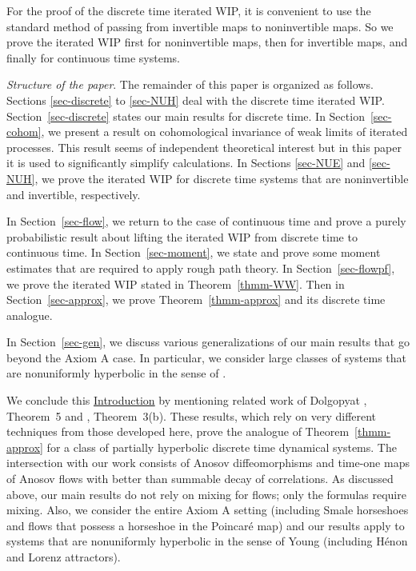 \documentclass[aop,MSNbibl,seceqn,dvips]{arximspdf}
\begin{document}
For the proof of the discrete time iterated WIP, it is convenient to
use the standard method of passing from invertible maps to
noninvertible maps. So we prove the iterated WIP first for
noninvertible maps, then for invertible maps, and finally for
continuous time systems.

\textit{Structure of the paper}.
The remainder of this paper is organized as follows.
Sections \ref{sec-discrete} to \ref{sec-NUH}
deal with the discrete time iterated WIP.
Section~\ref{sec-discrete} states our main results for discrete time.
In Section~\ref{sec-cohom}, we present a result on cohomological
invariance of weak limits of iterated processes. This result seems of
independent theoretical interest but in this paper it is used to
significantly simplify calculations.
In Sections \ref{sec-NUE} and \ref{sec-NUH}, we prove the iterated WIP
for discrete time systems that are noninvertible and invertible, respectively.

In Section~\ref{sec-flow}, we return to the case of continuous time and
prove a purely probabilistic result about lifting the iterated WIP from
discrete time to continuous time.
In Section~\ref{sec-moment}, we state and prove some moment estimates
that are required to apply rough path theory.
In Section~\ref{sec-flowpf}, we
prove the iterated WIP stated in Theorem~\ref{thmm-WW}.
Then in Section~\ref{sec-approx}, we prove Theorem~\ref{thmm-approx} and
its discrete time analogue.

In Section~\ref{sec-gen}, we discuss various generalizations of
our main results that go beyond the Axiom A case. In particular, we
consider large classes of systems that are nonuniformly hyperbolic in
the sense of \cite{Young98,Young99}.

We conclude this \hyperref[sec-intro]{Introduction} by mentioning
related work of
Dolgopyat \cite{Dolgopyat04}, Theorem~5 and \cite{Dolgopyat05},
Theorem~3(b).
These results, which rely on very different techniques from those
developed here, prove the analogue of Theorem~\ref{thmm-approx} for a class
of partially hyperbolic discrete time dynamical systems. The
intersection with our work consists of Anosov diffeomorphisms and
time-one maps of Anosov flows with better than summable decay of
correlations. As discussed above, our main results do not rely on
mixing for flows; only the formulas require mixing. Also, we consider
the entire Axiom A setting (including Smale horseshoes and flows
that possess a horseshoe in the Poincar\'e map) and our results apply
to systems that are nonuniformly hyperbolic in the sense of Young
(including H\'enon and Lorenz attractors).
\end{document}
